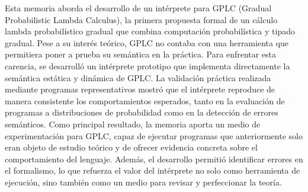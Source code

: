 Esta memoria aborda el desarrollo de un intérprete para GPLC (Gradual Probabilistic Lambda Calculus), la primera propuesta formal de un cálculo lambda probabilístico gradual que combina computación probabilística y tipado gradual. Pese a su interés teórico, GPLC no contaba con una herramienta que permitiera poner a prueba su semántica en la práctica. Para enfrentar esta carencia, se desarrolló un intérprete prototipo que implementa directamente la semántica estática y dinámica de GPLC. La validación práctica realizada mediante programas representativos mostró que el intérprete reproduce de manera consistente los comportamientos esperados, tanto en la evaluación de programas a distribuciones de probabilidad como en la detección de errores semánticos. Como principal resultado, la memoria aporta un medio de experimentación para GPLC, capaz de ejecutar programas que anteriormente solo eran objeto de estudio teórico y de ofrecer evidencia concreta sobre el comportamiento del lenguaje. Además, el desarrollo permitió identificar errores en el formalismo, lo que refuerza el valor del intérprete no solo como herramienta de ejecución, sino también como un medio para revisar y perfeccionar la teoría.

